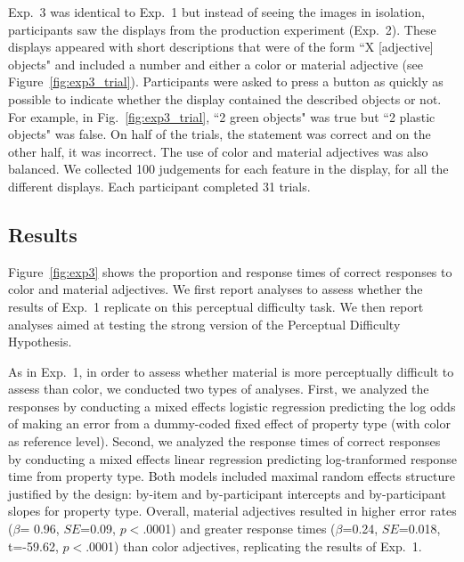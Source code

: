 \documentclass[12pt,letterpaper]{article}
\begin{document}
Exp.~3 was identical to Exp.~1 but instead of seeing the images in isolation, participants saw the displays from the production experiment (Exp.~2). These displays appeared with short descriptions that were of the form ``X [adjective] objects" and included a number and either a color or material adjective (see Figure~\ref{fig:exp3_trial}). Participants were asked to press a button as quickly as possible to indicate whether the display contained the described objects or not. For example, in Fig.~\ref{fig:exp3_trial}, ``2 green objects" was true but ``2 plastic objects" was false. On half of the trials, the statement was correct and on the other half, it was incorrect. The use of color and material adjectives was also balanced. We collected 100 judgements for each feature in the display, for all the different displays. Each participant completed 31 trials.

\subsection{Results} 

Figure~\ref{fig:exp3} shows the proportion and response times of correct responses to color and material adjectives.  We first report analyses to assess whether the results of Exp.~1 replicate on this perceptual difficulty task. We then report analyses aimed at testing the strong version of the Perceptual Difficulty Hypothesis.

As in Exp.~1, in order to assess whether material is more perceptually difficult to assess than color, we conducted two types of analyses. First, we analyzed the responses by conducting a mixed effects logistic regression predicting the log odds of making an error from a dummy-coded fixed effect of property type (with color as reference level). Second, we analyzed the response times of correct responses by conducting a mixed effects linear regression predicting log-tranformed response time from property type. Both models included maximal random effects structure justified by the design: by-item and by-participant intercepts and by-participant slopes for property type. Overall, material adjectives resulted in higher error rates ($\beta$= 0.96, $SE$=0.09, $p$$<$.0001) and greater response times ($\beta$=0.24, $SE$=0.018, t=-59.62, $p$$<$.0001) than color adjectives, replicating the results of Exp.~1. 
\end{document}
